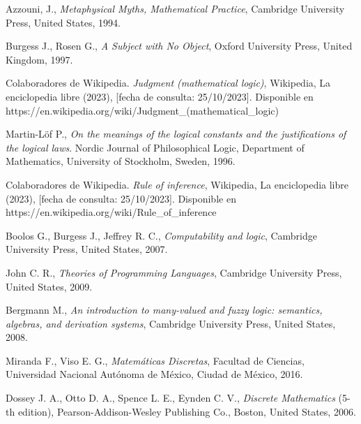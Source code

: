 \begin{thebibliography}{11}
    \bibitem{}
    \label{sec:59}
    \hypertarget{59}{}
    Azzouni, J.,  \textit{Metaphysical Myths, Mathematical Practice}, Cambridge University Press, United States, 1994.

    \bibitem{}
    \label{sec:60}
    \hypertarget{60}{}
    Burgess J., Rosen G., \textit{A Subject with No Object}, Oxford University Press, United Kingdom, 1997.
    
    \bibitem{}
    \label{sec:61}
    \hypertarget{61}{}
    Colaboradores de Wikipedia. \textit{Judgment (mathematical logic)}, Wikipedia, La enciclopedia libre (2023), [fecha de consulta: 25/10/2023]. Disponible en https://en.wikipedia.org/wiki/Judgment\_(mathematical\_logic)

    \bibitem{}
    \label{sec:62}
    \hypertarget{62}{}
    Martin-Löf P., \textit{On the meanings of the logical constants and the justifications of the logical laws}. Nordic Journal of Philosophical Logic, Department of Mathematics, University of Stockholm, Sweden, 1996.%

    \bibitem{}
    \label{sec:63}
    \hypertarget{63}{}
    Colaboradores de Wikipedia. \textit{Rule of inference}, Wikipedia, La enciclopedia libre (2023), [fecha de consulta: 25/10/2023]. Disponible en https://en.wikipedia.org/wiki/Rule\_of\_inference

    \bibitem{}
    \label{sec:64}
    \hypertarget{64}{}
    Boolos G., Burgess J., Jeffrey R. C., \textit{Computability and logic}, Cambridge University Press, United States, 2007. %

    \bibitem{}
    \label{sec:65}
    \hypertarget{65}{}
    John C. R., \textit{Theories of Programming Languages}, Cambridge University Press, United States, 2009.%
    
    \bibitem{}
    \label{sec:66}
    \hypertarget{66}{}
    Bergmann M.,  \textit{An introduction to many-valued and fuzzy logic: semantics, algebras, and derivation systems}, Cambridge University Press, United States, 2008.%

    \bibitem{}
    \label{sec:67}
    \hypertarget{67}{}
    Miranda F., Viso E. G., \textit{Matemáticas Discretas}, Facultad de Ciencias, Universidad Nacional Autónoma de México, Ciudad de México, 2016.%

    \bibitem{}
    \label{sec:68}
    \hypertarget{68}{}
    Dossey J. A., Otto D. A., Spence L. E., Eynden C. V., \textit{Discrete Mathematics} (5-th edition), Pearson-Addison-Wesley Publishing Co., Boston, United States,  2006.


\end{thebibliography}
